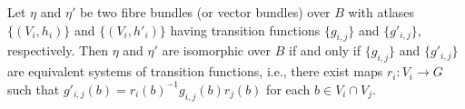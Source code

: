 Let $\eta$ and $\eta'$ be two fibre bundles (or vector bundles) over $B$ with atlases $\{(V_i, h_i)\}$ and $\{(V_i, h'_i)\}$ having transition functions $\{g_{i,j}\}$ and $\{g'_{i,j}\}$, respectively. Then $\eta$ and $\eta'$ are isomorphic over $B$ if and only if $\{g_{i,j}\}$ and $\{g'_{i,j}\}$ are equivalent systems of transition functions, i.e., there exist maps $r_i: V_i \rightarrow G$ such that $g'_{i,j}(b) = r_i(b)^{-1} g_{i,j}(b) r_j(b)$ for each $b \in V_i \cap V_j$.
